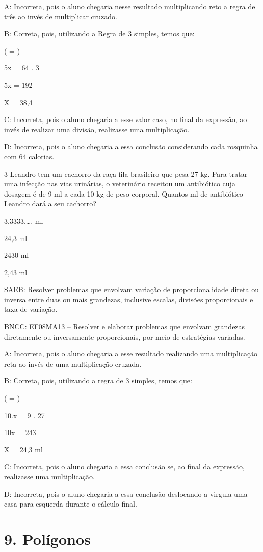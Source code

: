 {A: Incorreta, pois o aluno chegaria nesse resultado multiplicando reto a
regra de três ao invés de multiplicar cruzado.

B: Correta, pois, utilizando a Regra de 3 simples, temos que:

( = )

5x = 64 . 3

5x = 192

X = 38,4

C: Incorreta, pois o aluno chegaria a esse valor caso, no final da
expressão, ao invés de realizar uma divisão, realizasse uma
multiplicação.

D: Incorreta, pois o aluno chegaria a essa conclusão considerando cada
rosquinha com 64 calorias.

\num{3} Leandro tem um cachorro da raça fila brasileiro que pesa 27 kg. Para
tratar uma infecção nas vias urinárias, o veterinário receitou um
antibiótico cuja dosagem é de 9 ml a cada 10 kg de peso corporal.
Quantos ml de antibiótico Leandro dará a seu cachorro?
\item 3,3333.\ldots. ml
\item 24,3 ml
\item 2430 ml
\item 2,43 ml

SAEB: Resolver problemas que envolvam variação de proporcionalidade
direta ou inversa entre duas ou mais grandezas, inclusive escalas,
divisões proporcionais e taxa de variação.

BNCC: EF08MA13 -- Resolver e elaborar problemas que envolvam grandezas
diretamente ou inversamente proporcionais, por meio de estratégias
variadas.

A: Incorreta, pois o aluno chegaria a esse resultado realizando uma
multiplicação reta ao invés de uma multiplicação cruzada.

B: Correta, pois, utilizando a regra de 3 simples, temos que:

( = )

10.x = 9 . 27

10x = 243

X = 24,3 ml

C: Incorreta, pois o aluno chegaria a essa conclusão se, ao final da
expressão, realizasse uma multiplicação.

D: Incorreta, pois o aluno chegaria a essa conclusão deslocando a
virgula uma casa para esquerda durante o cálculo final.


\section{9. Polígonos}

}
